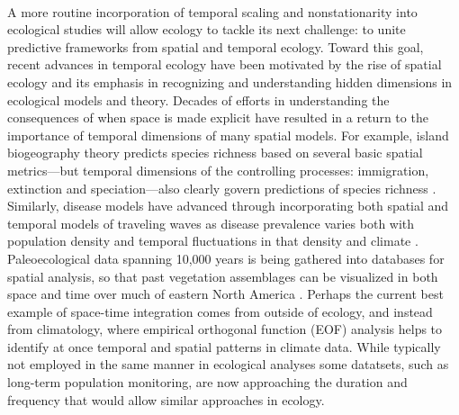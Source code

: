 \documentclass[11pt,a4paper,oneside]{article}
\begin{document}
\\

\noindent A more routine incorporation of temporal scaling and nonstationarity into ecological studies will allow ecology to tackle its next challenge: to unite predictive frameworks from spatial and temporal ecology. Toward this goal, recent advances in temporal ecology have been motivated by the rise of spatial ecology and its emphasis in recognizing and understanding hidden dimensions in ecological models and theory. Decades of efforts in understanding the consequences of when space is made explicit have resulted in a return to the importance of temporal dimensions of many spatial models. For example, island biogeography theory predicts species richness based on several basic spatial metrics---but temporal dimensions of the controlling processes: immigration, extinction and speciation---also clearly govern predictions of species richness \citep{Wiens2011}. Similarly, disease models have advanced through incorporating both spatial and temporal models of traveling waves as disease prevalence varies both with population density and temporal fluctuations in that density \citep{Grenfell:2001ox} and climate \citep{lipp2002}. Paleoecological data spanning 10,000 years is being gathered into databases for spatial analysis, so that past vegetation assemblages can be visualized in both space and time over much of eastern North America \citep{Brewer2012}. Perhaps the current best example of space-time integration comes from outside of ecology, and instead from climatology, where empirical orthogonal function (EOF) analysis helps to identify at once temporal and spatial patterns in climate data. While typically not employed in the same manner in ecological analyses some datatsets, such as long-term population monitoring, are now approaching the duration and frequency that would allow similar approaches in ecology. 
\end{document}
